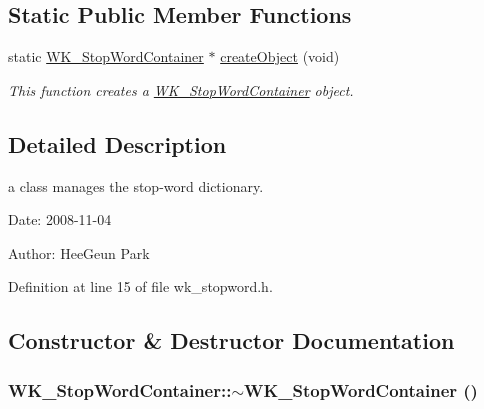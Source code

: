 \subsection*{Static Public Member Functions}
\begin{CompactItemize}
\item 
static \hyperlink{classWK__StopWordContainer}{WK\_\-StopWordContainer} $\ast$ \hyperlink{classWK__StopWordContainer_a880c07993f02ddb6d821512d0e5bd0a}{createObject} (void)
\begin{CompactList}\small\item\em This function creates a \hyperlink{classWK__StopWordContainer}{WK\_\-StopWordContainer} object. \item\end{CompactList}\end{CompactItemize}


\subsection{Detailed Description}
a class manages the stop-word dictionary. 

\begin{Desc}
\item[Date:]2008-11-04 \end{Desc}
\begin{Desc}
\item[Author:]HeeGeun Park \end{Desc}


Definition at line 15 of file wk\_\-stopword.h.

\subsection{Constructor \& Destructor Documentation}
\hypertarget{classWK__StopWordContainer_bbda87b2202288b98b9d3639595b9c88}{
\subsubsection[{$\sim$WK\_\-StopWordContainer}]{\setlength{\rightskip}{0pt plus 5cm}WK\_\-StopWordContainer::$\sim$WK\_\-StopWordContainer ()}}
\label{classWK__StopWordContainer_bbda87b2202288b98b9d3639595b9c88}




